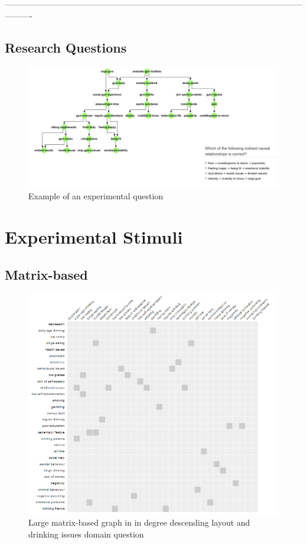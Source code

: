 \documentclass{l4proj}
\begin{document}
\begin{appendices}
----------------------------------------------------------------------------------------------------------------------

\section{Research Questions}

\begin{figure}
\centering
\includegraphics[width=24cm]{exampleQuestion.PNG}
\caption{Example of an experimental question}
\label{exampleQuestion}
\end{figure}


\chapter{Experimental Stimuli}

\section{Matrix-based}

\begin{figure}[H]
\centering
\includegraphics[width=16cm]{images/drinkingLargeInDD.PNG}
\caption{Large matrix-based graph in in degree descending layout and drinking issues domain question}
\label{drinkingLargeInDD}
\end{figure}



\end{appendices}
\end{document}
